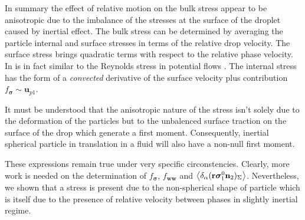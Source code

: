 In summary the effect of relative motion on the bulk stress appear to be anisotropic due to the imbalance of the stresses at the surface of the droplet caused by inertial effect. 
The bulk stress can be determined by averaging the particle internal and surface stresses in terms of the relative drop velocity. 
The surface stress brings quadratic terms with respect to the relative phase velocity. 
In is in fact similar to the Reynolds stress in potential flows \citet{van1982bubble}. 
The internal stress has the form of a \textit{convected} derivative of the surface velocity plus contribution $f_{\bm\sigma} \sim \textbf{u}_{p 1}$. 

It must be understood that the anisotropic nature of the stress isn't solely due to the deformation of the particles but to the unbalenced surface traction on the surface of the drop which generate a first moment. 
Consequently, inertial spherical particle in translation in a fluid will also have a non-null first moment.  

These expressions remain true under very specific circonstencies.
Clearly, more work is needed on the determination of $f_{\bm\sigma}$, $f_{\textbf{ww}}$ and $\left<\delta_\alpha ( \textbf r \bm\sigma_1^0 \textbf{n}_2 )_{\Sigma}\right>$.  
Nevertheless, we shown that a stress is present due to the non-spherical shape of particle which is itself due to the presence of relative velocity between phases in slightly inertial regime. 